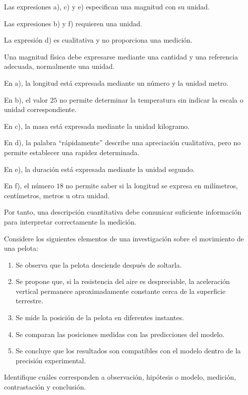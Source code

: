 \begin{respuesta}
Las expresiones a), c) y e) especifican una magnitud con su unidad.

Las expresiones b) y f) requieren una unidad.

La expresión d) es cualitativa y no proporciona una medición.
\end{respuesta}

\begin{explicacion}
Una magnitud física debe expresarse mediante una cantidad y una referencia adecuada, normalmente una unidad.

En a), la longitud está expresada mediante un número y la unidad metro.

En b), el valor \(25\) no permite determinar la temperatura sin indicar la escala o unidad correspondiente.

En c), la masa está expresada mediante la unidad kilogramo.

En d), la palabra ``rápidamente'' describe una apreciación cualitativa, pero no permite establecer una rapidez determinada.

En e), la duración está expresada mediante la unidad segundo.

En f), el número \(18\) no permite saber si la longitud se expresa en milímetros, centímetros, metros u otra unidad.

Por tanto, una descripción cuantitativa debe comunicar suficiente información para interpretar correctamente la medición.
\end{explicacion}


\begin{ejercicio}
Considere los siguientes elementos de una investigación sobre el movimiento de una pelota:

\begin{enumerate}[label=\alph*)]
    \item Se observa que la pelota desciende después de soltarla.
    \item Se propone que, si la resistencia del aire es despreciable, la aceleración vertical permanece aproximadamente constante cerca de la superficie terrestre.
    \item Se mide la posición de la pelota en diferentes instantes.
    \item Se comparan las posiciones medidas con las predicciones del modelo.
    \item Se concluye que los resultados son compatibles con el modelo dentro de la precisión experimental.
\end{enumerate}

Identifique cuáles corresponden a observación, hipótesis o modelo, medición, contrastación y conclusión.
\end{ejercicio}


